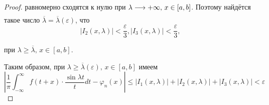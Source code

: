 \begin{proof}
    равномерно сходятся к нулю при $\lambda \underset{}{\longrightarrow} +\infty, \,
    x \in [a, b]$. Поэтому найдётся такое число $\overline{\lambda} =
    \overline{\lambda}(\varepsilon)$, что
    \[ 
        |I_2(x, \lambda)| < \frac{\varepsilon}{3},
        |I_3(x, \lambda)| < \frac{\varepsilon}{3},
    \]

    при $\lambda \geq \overline{\lambda}, \, x \in [a, b]$.

    Таким образом, при $\lambda \geq \overline{\lambda}(\varepsilon), \, 
    x \in [a, b]$ имеем
    \[ 
        \left| \frac{1}{\pi} \int_{-\infty}^\infty f(t + x) \cdot
            \frac{\sin \lambda t}{t} dt - \varphi_n (x) \right| \leq
        |I_1(x, \lambda)| + |I_2(x, \lambda)| + |I_3(x, \lambda)| < \varepsilon
    \]
\end{proof}
